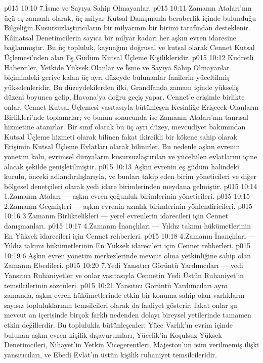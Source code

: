 \vs p015 10:10 7.\bibnobreakspace İsme ve Sayıya Sahip Olmayanlar.
\vs p015 10:11 Zamanın Ataları’nın üçü eş zamanlı olarak, üç milyar Kutsal Danışmanla beraberlik içinde bulunduğu Bilgeliğin Kusursuzlaştırıcıların bir milyarının bir birimi tarafından desteklenir. Kâinatsal Denetimcilerin sayıca bir milyar kadarı her aşkın evren idaresine bağlanmıştır. Bu üç topluluk, kaynağını doğrusal ve kutsal olarak Cennet Kutsal Üçlemesi’nden alan Eş Güdüm Kutsal Üçleme Kişilikleridir.
\vs p015 10:12 Kudretli Haberciler, Yetkide Yüksek Olanlar ve İsme ve Sayıya Sahip Olmayanlar biçimindeki geriye kalan üç ayrı düzeyde bulunanlar fanilerin yüceltilmiş yükselenleridir. Bu düzeydekilerden ilki, Grandfanda zamanı içinde yükseliş düzeni boyunca gelip, Havona’ya doğru geçiş yapar. Cennet’e erişimle birlikte onlar, Cennet Kutsal Üçlemesi vasıtasıyla bütünleşen Kesinliğe Erişecek Olanların Birlikleri’nde toplanırlar; ve bunun sonucunda ise Zamanın Ataları’nın tanrısal hizmetine atanırlar. Bir sınıf olarak bu üç ayrı düzey, mevcudiyet bakımından Kutsal Üçleme hizmeti olarak bilinen fakat ikircikli bir kökene sahip olarak Erişimin Kutsal Üçleme Evlatları olarak bilinirler. Bu nedenle aşkın evrenin yönetim kolu, evrimsel dünyaların kusursuzlaştırılan ve yüceltilen evlatlarını içine alacak şekilde genişletilmiştir.
\vs p015 10:13 Aşkın evrenin eş güdüm halindeki kurulu, önceki adlandırılışlarıyla, ve bunları takip eden birim yöneticileri ve diğer bölgesel denetçileri olarak yedi idare birimlerinden meydana gelmiştir.
\vs p015 10:14 1.\bibnobreakspace Zamanın Ataları --- aşkın evren çoğunluk birimlerinin yöneticileri.
\vs p015 10:15 2.\bibnobreakspace Zamanın Geçmişleri --- aşkın evrenin azınlık birimlerinin yönlendiricileri.
\vs p015 10:16 3.\bibnobreakspace Zamanın Birliktelikleri --- yerel evrenlerin idarecileri için Cennet danışmanları.
\vs p015 10:17 4.\bibnobreakspace Zamanın İnançlıları --- Yıldız takımı hükümetlerinin En Yüksek idarecileri için Cennet rehberleri.
\vs p015 10:18 4.\bibnobreakspace Zamanın İnançlıları --- Yıldız takımı hükümetlerinin En Yüksek idarecileri için Cennet rehberleri.
\vs p015 10:19 6.\bibnobreakspace Aşkın evren yönetim merkezlerinde mevcut olma yetkinliğine sahip olan Zamanın Ebedileri.
\vs p015 10:20 7.\bibnobreakspace Yedi Yansıtıcı Görüntü Yardımcıları --- yedi Yansıtıcı Ruhaniyetler ve onlar vasıtasıyla Cennetin Yedi Üstün Ruhaniyet’in temsilcilerinin sözcüleri.
\vs p015 10:21 Yansıtıcı Görüntü Yardımcıları aynı zamanda, aşkın evren hükümetlerinde etkin bir konuma sahip olan varlıkların sayısız topluluklarının temsilcileri olarak da faaliyet gösterir; fakat onlar şu mevcut an içerisinde birçok farklı nedenden dolayı bireysel yetilerinde tamamen etkin değillerdir. Bu toplulukla bütünleşenler: Yüce Varlık’ın evrim içinde bulunan aşkın evren kişilik dışavurumları, Yücelik’in Koşulsuz Yüksek Denetimcileri, Nihayet’in Yetkin Vicegerentleri, Majeston’un isim verilmemiş ilişki yansıtıcıları, ve Ebedi Evlat’ın üstün kişilik ruhaniyet temsilcileridir.
